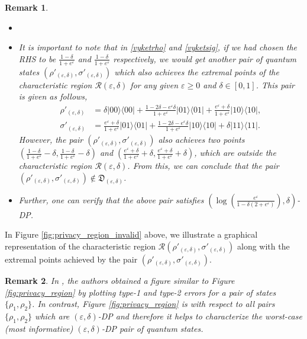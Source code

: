 \documentclass[onecolumn,ldraftcls, 11pt]{IEEEtran}
\newcommand{\ketbra}[1]{|#1\rangle\langle#1|}
\newcommand{\eps}{\varepsilon}
\newcommand*{\cR}{\mathcal{R}}
\newtheorem{remark}{Remark}
\begin{document}
\begin{remark}\label{remark_worst_choice}
\begin{itemize}
    \item[] ~
    \item It is important to note that in \eqref{vyketrho} and \eqref{vyketsig}, if we had chosen the RHS to be $\frac{1-\delta}{1+e^\eps}$ and $\frac{1-\delta}{1+e^\eps}$ respectively, we would get another pair of quantum states $(\rho'_{(\eps,\delta)},\sigma'_{(\eps,\delta)})$ which also achieves the extremal points of the characteristic region $\cR(\eps,\delta)$ for any given $\eps \geq 0$ and $\delta \in [0,1]$. This pair is given as follows,
    \begin{align}
        \rho'_{(\eps,\delta)} & = \delta \ketbra{00} + \frac{1-2\delta-e^\eps\delta}{1+e^\eps} \ketbra{01} + \frac{e^\eps + \delta}{1+e^\eps} \ketbra{10},\label{eq_rho'_simp}\\
        \sigma'_{(\eps,\delta)} & =  \frac{e^\eps + \delta}{1+e^\eps} \ketbra{01} + \frac{1-2\delta-e^\eps\delta}{1+e^\eps} \ketbra{10} + \delta \ketbra{11}.\label{eq_sigma'_simp}
    \end{align}
    However, the pair  $(\rho'_{(\eps,\delta)},\sigma'_{(\eps,\delta)})$ also achieves two points $\left(\frac{1 -\delta}{1+e^\eps} - \delta,\frac{1 -\delta}{1+e^\eps} - \delta\right)$ and $\left(\frac{e^\eps+\delta}{1 + e^\eps} +\delta, \frac{e^\eps+\delta}{1 + e^\eps} +\delta\right)$, which are outside the characteristic region $\cR(\eps,\delta)$. From this, we can conclude that the pair $(\rho'_{(\eps,\delta)},\sigma'_{(\eps,\delta)}) \not\in \mathfrak{D}_{(\eps,\delta)}$.
    \item Further, one can verify that the above pair satisfies $(\log (\frac{e^\eps}{1 - \delta(2 + e^\eps)}),\delta)$-DP.

\end{itemize}    
\end{remark}

In Figure \ref{fig:privacy_region_invalid} above, we illustrate a graphical representation of the characteristic region $\cR(\rho'_{(\eps,\delta)},\sigma'_{(\eps,\delta)} )$ along with the extremal points achieved by the pair $(\rho'_{(\eps,\delta)},\sigma'_{(\eps,\delta)})$.

\begin{remark}
    In \cite{BG17}, the authors obtained a figure similar to Figure \ref{fig:privacy_region} by plotting type-1 and type-2 errors for a pair of states $\{\rho_1,\rho_2\}$. In contrast, Figure \ref{fig:privacy_region} is with respect to all pairs $\{\rho_1,\rho_2\}$ which are $(\eps,\delta)$-DP and therefore it helps to characterize the worst-case (most informative) $(\eps,\delta)$-DP pair of quantum states.
\end{remark}
\end{document}
